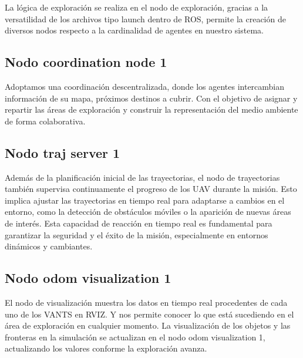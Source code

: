La lógica de exploración se realiza en el nodo de exploración, gracias a la versatilidad de los archivos tipo launch dentro de ROS, permite la creación de diversos nodos respecto a la cardinalidad de agentes en nuestro sistema.

\subsection*{Nodo coordination node 1}

Adoptamos una coordinación descentralizada, donde los agentes intercambian información de su mapa, próximos destinos a cubrir.
Con el objetivo de asignar y repartir las áreas de exploración y construir la representación del medio ambiente de forma colaborativa.

\subsection*{Nodo traj server 1}
Además de la planificación inicial de las trayectorias, el nodo de trayectorias también supervisa continuamente el progreso de los UAV durante la misión. Esto implica ajustar las trayectorias en tiempo real para adaptarse a cambios en el entorno, como la detección de obstáculos móviles o la aparición de nuevas áreas de interés. Esta capacidad de reacción en tiempo real es fundamental para garantizar la seguridad y el éxito de la misión, especialmente en entornos dinámicos y cambiantes.

\subsection*{Nodo odom visualization 1}

El nodo de visualización muestra los datos en tiempo real procedentes de cada uno de los VANTS en RVIZ. Y nos permite conocer lo que está sucediendo en el área de exploración en cualquier momento.
La visualización de los objetos y las fronteras en la simulación se actualizan en el nodo odom visualization 1, actualizando los valores conforme la exploración avanza.
